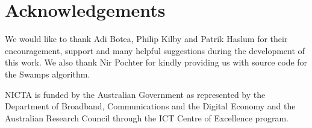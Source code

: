 \section{Acknowledgements}
We would like to thank Adi Botea, Philip Kilby and Patrik Haslum for their 
encouragement, support and many helpful suggestions during the development 
of this work.
We also thank Nir Pochter for kindly providing us with source code for the
Swamps algorithm.

NICTA is funded by the Australian Government as represented by the Department of 
Broadband, Communications and the Digital Economy and the Australian Research 
Council through the ICT Centre of Excellence program.
